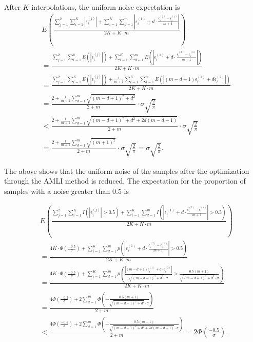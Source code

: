 \documentclass[mathematics,article,accept,pdftex,moreauthors]{Definitions/mdpi}
\begin{document}
After $K$ interpolations, the uniform noise expectation is
\begin{equation*}
	\begin{split}
		& E(\frac{\sum_{j=1}^{2}\sum_{i=1}^{K}|\epsilon_{i}^{(j)}|+\sum_{i=1}^{K}\sum_{d=1}^{m}|\epsilon_{i}^{(1)} + d \cdot\frac{\epsilon_{i}^{(2)}-\epsilon_{i}^{(1)}}{m+1}|}{2K+K \cdot m}) \\ 
		& = \frac{\sum_{j=1}^{2}\sum_{i=1}^{k}E(|\epsilon_{i}^{(j)}|)+\sum_{i=1}^{K}\sum_{d=1}^{m}E(|\epsilon_{i}^{(1)} + d \cdot\frac{\epsilon_{i}^{(2)}-\epsilon_{i}^{(1)}}{m+1}|)}{2K+K \cdot m}\\
		& =
		\frac{\sum_{j=1}^{2}\sum_{i=1}^{K}E(|\epsilon_{i}^{(j)}|)+\frac{1}{m+1}\sum_{i=1}^{K}\sum_{d=1}^{m}E(|(m-d+1)\epsilon_{i}^{(1)} + d \epsilon_{i}^{(2)}|)}{2K+K \cdot m}\\
		& =
		\frac{2+\frac{1}{m+1}\sum_{d=1}^{m}\sqrt{(m-d+1)^{2}+d^{2}}}{2 + m}
		\cdot \sigma \sqrt{\frac{2}{\pi}} \\
		& < 
		\frac{2+\frac{1}{m+1}\sum_{d=1}^{m}\sqrt{(m-d+1)^{2}+d^{2}+2d(m-d+1)}}{2 + m}
		\cdot \sigma \sqrt{\frac{2}{\pi}}\\
		& =
		\frac{2+\frac{1}{m+1}\sum_{d=1}^{m}\sqrt{(m+1)^{2}}}{2 + m}
		\cdot \sigma \sqrt{\frac{2}{\pi}} = \sigma \sqrt{\frac{2}{\pi}}.
	\end{split}
\end{equation*}

The above shows that the uniform noise of the samples after the optimization through the AMLI method is reduced. The expectation for the proportion of samples with a noise greater than 0.5 is

\begin{equation*}
	\begin{split}
		& E(\frac{\sum_{j=1}^{2}\sum_{i=1}^{K}I(|\epsilon_{i}^{(j)}|>0.5)+
			\sum_{i=1}^{K}\sum_{d=1}^{m} I(|\epsilon_{i}^{(1)} + d \cdot \frac{\epsilon_{i}^{(2)}-\epsilon_{i}^{(1)}}{m+1}| > 0.5 )}{2K+K \cdot m}) \\ 
		& = 
		\frac{4K \cdot \Phi(\displaystyle{\frac{-0.5}{\sigma}}) + \sum_{i=1}^{K}\sum_{d=1}^{m}p(|\epsilon_{i}^{(1)}+ d \cdot \frac{\epsilon_{i}^{(2)} - \epsilon_{i}^{(1)}}{m+1}|>0.5)}{2K+K \cdot m} \\ 
		& = 
		\frac{4K \cdot \Phi(\displaystyle{\frac{-0.5}{\sigma}}) + \sum_{i=1}^{K}\sum_{d=1}^{m}p(\frac{|(m-d+1)\epsilon_{i}^{(1)}+d\cdot \epsilon_{i}^{(2)}|}{\sqrt{(m-d+1)^{2}+d^{2}} \cdot \sigma} >
			\frac{0.5(m+1)}{\sqrt{(m-d+1)^{2}+d^{2}} \cdot \sigma})}{2K+K \cdot m} \\ 
		& = 
		\frac{4  \Phi(\displaystyle{\frac{-0.5}{\sigma}})+ 2\sum_{d=1}^{m}\Phi
		(-\frac{0.5(m+1)}{\sqrt{(m-d+1)^{2}+d^{2}} \cdot \sigma}) }{2 + m} \\ 
		& <
		\frac{4  \Phi(\displaystyle{\frac{-0.5}{\sigma}})+ 2\sum_{d=1}^{m}\Phi
			(-\frac{0.5(m+1)}{\sqrt{(m-d+1)^{2}+d^{2} +2d(m-d+1)} \cdot \sigma}) }{2 + m}
		= 2 \Phi(\displaystyle{\frac{-0.5}{\sigma}}).
	\end{split}
\end{equation*}
\end{document}
